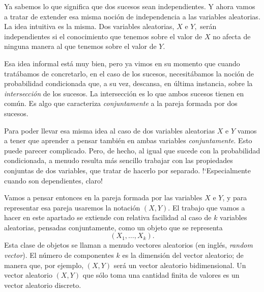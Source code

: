 Ya sabemos lo que significa que dos sucesos sean independientes. Y ahora vamos a tratar de extender esa misma noción de independencia a las variables aleatorias. La idea intuitiva es la misma. Dos variables aleatorias, $X$ e $Y,$ serán independientes si el conocimiento que tenemos sobre el valor de $X$ no afecta de ninguna manera al que tenemos sobre el valor de $Y$.

Esa idea informal está muy bien, pero ya vimos en su momento que cuando tratábamos de concretarlo, en el caso de los sucesos, necesitábamos la noción de probabilidad condicionada que, a su vez, descansa, en última instancia, sobre la {\em intersección} de los sucesos. La intersección es lo que ambos sucesos tienen en común. Es algo que caracteriza {\em conjuntamente} a la pareja formada por dos sucesos.

Para poder llevar esa misma idea al caso de dos variables aleatorias $X$ e $Y$ vamos a tener que aprender a pensar también en ambas variables {\em conjuntamente}. Esto puede parecer complicado. Pero, de hecho, al igual que sucede con la probabilidad condicionada, a menudo resulta más sencillo trabajar con las propiedades conjuntas de dos variables, que tratar de hacerlo por separado.  {!`}Especialmente cuando son dependientes, claro!

Vamos a pensar entonces en la pareja formada por las variables $X$ e $Y$, y para representar esa pareja usaremos la notación $(X,Y)$. El trabajo que vamos a hacer en este apartado se extiende con relativa facilidad al caso de $k$ variables aleatorias, pensadas conjuntamente, como un objeto que se representa
\[(X_1,\ldots,X_k).\]
Esta clase de objetos se llaman a menudo {\sf vectores aleatorios} (en inglés, {\em random vector}). El número de componentes $k$ es la {\sf dimensión} del vector aleatorio; de manera que, por ejemplo, $(X,Y)$ será un vector aleatorio bidimensional. Un vector aleatorio $(X,Y)$ que sólo toma una cantidad finita de valores es un {\sf vector aleatorio discreto}.

